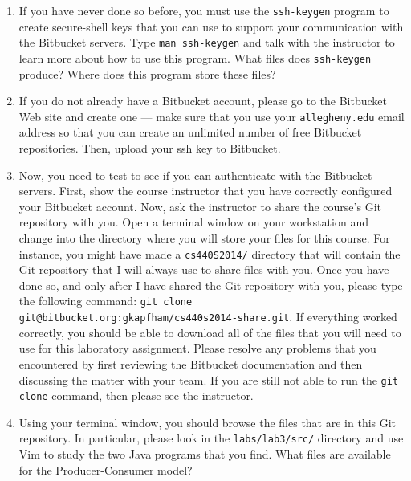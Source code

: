 \begin{enumerate}
	
  \item If you have never done so before, you must use the {\tt ssh-keygen} program to create secure-shell keys that you
    can use to support your communication with the Bitbucket servers.  Type {\tt man ssh-keygen} and talk with the
    instructor to learn more about how to use this program.  What files does {\tt ssh-keygen} produce?  Where
    does this program store these files?

  \item If you do not already have a Bitbucket account, please go to the Bitbucket Web site and create one --- 
    make sure that you use your {\tt allegheny.edu} email address so that you can create an unlimited number of free
    Bitbucket repositories. Then, upload your ssh key to Bitbucket.

  \item Now, you need to test to see if you can authenticate with the Bitbucket servers.  First, show the course instructor that
    you have correctly configured your Bitbucket account.  Now, ask the instructor to share the course's Git repository with you.
    Open a terminal window on your workstation and change into the directory where you will store your files for this course.  For
    instance, you might have made a {\tt cs440S2014/} directory that will contain the Git repository that I will always use to
    share files with you.  Once you have done so, and only after I have shared the Git repository with you, please type the
    following command: {\tt git clone git@bitbucket.org:gkapfham/cs440s2014-share.git}.  If everything worked correctly, you
    should be able to download all of the files that you will need to use for this laboratory assignment. Please resolve any
    problems that you encountered by first reviewing the Bitbucket documentation and then discussing the matter with your team. If
    you are still not able to run the {\tt git clone} command, then please see the instructor.

  \item Using your terminal window, you should browse the files that are in this Git repository.  In particular, please look in
    the {\tt labs/lab3/src/} directory and use Vim to study the two Java programs that you find. What files are available for the
    Producer-Consumer model?

\end{enumerate}

